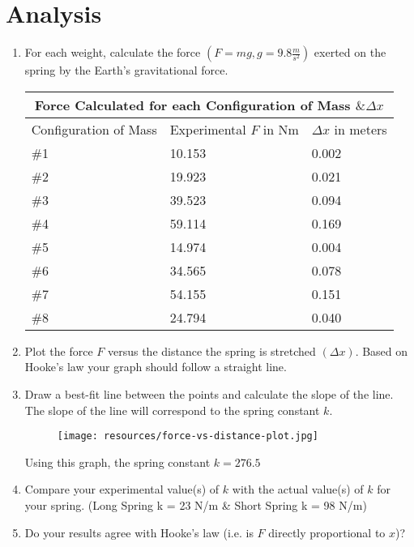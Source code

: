 \chapter{Analysis}

\begin{enumerate}
  \item For each weight, calculate the force $(F = mg, g = 9.8\frac{m}{s^2})$ exerted on
        the spring by the Earth's gravitational force.

  	\begin{tabular} { |p{2cm}|p{2cm}|p{2cm}| }
			\hline
  		\multicolumn{3}{|c|}{Force Calculated for each Configuration of Mass $\& \Delta x$} \\
			\hline 
			\centering Configuration of Mass & Experimental $F$ in Nm & $\Delta x$ in meters \\ 
			\hline
			\#1 & 10.153 & 0.002 \\
			\hline
			\#2 & 19.923 & 0.021 \\
			\hline
			\#3 & 39.523 & 0.094 \\
			\hline
			\#4 & 59.114 & 0.169 \\
			\hline
			\#5 & 14.974 & 0.004 \\
			\hline
			\#6 & 34.565 & 0.078 \\
			\hline
			\#7 & 54.155 & 0.151 \\
			\hline
			\#8 & 24.794 & 0.040 \\
			\hline
    \end{tabular}

  \item Plot the force $F$ versus the distance the spring is stretched $(\Delta x)$.
        Based on Hooke's law your graph should follow a straight line.


  \item Draw a best-fit line between the points and calculate the slope of the line.
        The slope of the line will correspond to the spring constant $k$.

	\begin{figure}[h!]
		\centerline{\texttt{[image: resources/force-vs-distance-plot.jpg]}}
	\end{figure}
	Using this graph, the spring constant $k = 276.5$

  \item Compare your experimental value(s) of $k$ with the actual value(s) of $k$ for 
        your spring. (Long Spring k = 23 N/m \& Short Spring k = 98 N/m)

  \item Do your results agree with Hooke's law (i.e. is $F$ directly proportional to 
        $x$)?
\end{enumerate}
